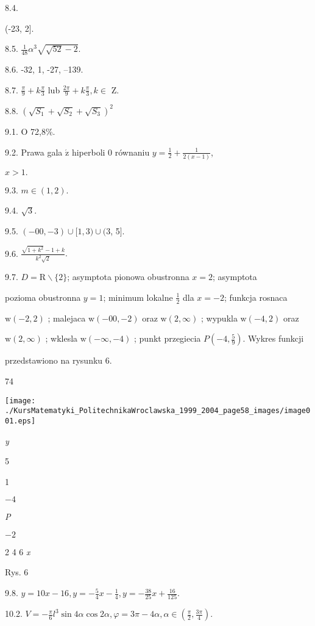\documentclass[a4paper,12pt]{article}
\begin{document}
8.4.

(-23, 2].

8.5. $\displaystyle \frac{1}{48}\alpha^{3}\sqrt{\sqrt{52}-2}.$

8.6. -32, 1, -27, --139.

8.7. $\displaystyle \frac{\pi}{9}+k\frac{\pi}{3}$ lub $\displaystyle \frac{2\pi}{9}+k\frac{\pi}{3},  k\in$ Z.

8.8. $(\sqrt{S_{1}}+\sqrt{S_{2}}+\sqrt{S_{3}})^{2}$

9.1. $\mathrm{O}$ 72,8\%.

9.2. Prawa gala $\acute{\mathrm{z}}$ hiperboli $0$ równaniu $y=\displaystyle \frac{1}{2}+\frac{1}{2(x-1)}$,

$x>1.$

9.3. $m\in(1,2).$

9.4. $\sqrt{3}.$

9.5. $(- 00,-3)\cup[1,3)\cup(3$, 5$].$

9.6. $\displaystyle \frac{\sqrt{1+k^{2}}-1+k}{k^{2}\sqrt{2}}.$

9.7. $D=\mathrm{R}\backslash \{2\}$; asymptota pionowa obustronna $x= 2$; asymptota

pozioma obustronna $y=1$; minimum lokalne $\displaystyle \frac{1}{2}$ dla $x=-2$; funkcja rosnaca

$\mathrm{w} (-2,2)$ ; malejaca $\mathrm{w} (- 00,-2)$ oraz $\mathrm{w} (2,\infty)$ ; wypukla $\mathrm{w} (-4,2)$ oraz

$\mathrm{w}(2,\infty)$ ; wklesla $\mathrm{w}(-\infty,-4)$ ; punkt przegiecia $P(-4,\displaystyle \frac{5}{9})$. Wykres funkcji

przedstawiono na rysunku 6.





74
\begin{center}
\texttt{[image: ./KursMatematyki\_PolitechnikaWroclawska\_1999\_2004\_page58\_images/image001.eps]}
\end{center}
{\it y}

5

1

$-4$

{\it P}

$-2$

2 4  6 {\it x}

Rys. 6

9.8. $y=10x-16, y=-\displaystyle \frac{5}{4}x-\frac{1}{4}, y=-\displaystyle \frac{38}{25}x+\frac{16}{125}.$

10.2. $V=-\displaystyle \frac{\pi}{6}l^{3}\sin 4\alpha\cos 2\alpha, \varphi=3\pi-4\alpha, \alpha\in (\displaystyle \frac{\pi}{2},\frac{3\pi}{4}).$
\end{document}
